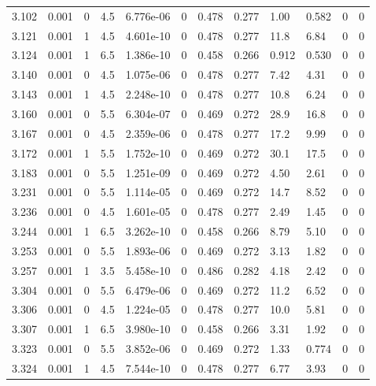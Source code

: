 \documentclass[preview]{standalone}
\begin{document}
{{{{{{\begin{tabular}{L{1.2cm}C{1.2cm} C{0.3cm}C{0.5cm} C{1.4cm}C{1.4cm} C{1.4cm}C{1.4cm} C{1.6cm}C{1.6cm} C{1.6cm}C{1.6cm}}
  3.102  &  0.001  & 0     & 4.5 &  6.776e-06  & 0  &  0.478&   0.277& 1.00 & 0.582   &  0 & 0  \\ 
  3.121  &  0.001  & 1     & 4.5 &  4.601e-10  & 0  &  0.478&   0.277& 11.8 & 6.84   &  0 & 0  \\ 
  3.124  &  0.001  & 1     & 6.5 &  1.386e-10  & 0  &  0.458&   0.266& 0.912 & 0.530   &  0 & 0  \\ 
  3.140  &  0.001  & 0     & 4.5 &  1.075e-06  & 0  &  0.478&   0.277& 7.42 & 4.31   &  0 & 0  \\ 
  3.143  &  0.001  & 1     & 4.5 &  2.248e-10  & 0  &  0.478&   0.277& 10.8 & 6.24   &  0 & 0  \\ 
  3.160  &  0.001  & 0     & 5.5 &  6.304e-07  & 0  &  0.469&   0.272& 28.9 & 16.8   &  0 & 0  \\ 
  3.167  &  0.001  & 0     & 4.5 &  2.359e-06  & 0  &  0.478&   0.277& 17.2 & 9.99   &  0 & 0  \\ 
  3.172  &  0.001  & 1     & 5.5 &  1.752e-10  & 0  &  0.469&   0.272& 30.1 & 17.5   &  0 & 0  \\ 
  3.183  &  0.001  & 0     & 5.5 &  1.251e-09  & 0  &  0.469&   0.272& 4.50 & 2.61   &  0 & 0  \\ 
  3.231  &  0.001  & 0     & 5.5 &  1.114e-05  & 0  &  0.469&   0.272& 14.7 & 8.52   &  0 & 0  \\ 
  3.236  &  0.001  & 0     & 4.5 &  1.601e-05  & 0  &  0.478&   0.277& 2.49 & 1.45   &  0 & 0  \\ 
  3.244  &  0.001  & 1     & 6.5 &  3.262e-10  & 0  &  0.458&   0.266& 8.79 & 5.10   &  0 & 0  \\ 
  3.253  &  0.001  & 0     & 5.5 &  1.893e-06  & 0  &  0.469&   0.272& 3.13 & 1.82   &  0 & 0  \\ 
  3.257  &  0.001  & 1     & 3.5 &  5.458e-10  & 0  &  0.486&   0.282& 4.18 & 2.42   &  0 & 0  \\ 
  3.304  &  0.001  & 0     & 5.5 &  6.479e-06  & 0  &  0.469&   0.272& 11.2 & 6.52   &  0 & 0  \\ 
  3.306  &  0.001  & 0     & 4.5 &  1.224e-05  & 0  &  0.478&   0.277& 10.0 & 5.81   &  0 & 0  \\ 
  3.307  &  0.001  & 1     & 6.5 &  3.980e-10  & 0  &  0.458&   0.266& 3.31 & 1.92   &  0 & 0  \\ 
  3.323  &  0.001  & 0     & 5.5 &  3.852e-06  & 0  &  0.469&   0.272& 1.33 & 0.774   &  0 & 0  \\ 
  3.324  &  0.001  & 1     & 4.5 &  7.544e-10  & 0  &  0.478&   0.277& 6.77 & 3.93   &  0 & 0  \\ 

\end{tabular}}}}}}}
\end{document}
